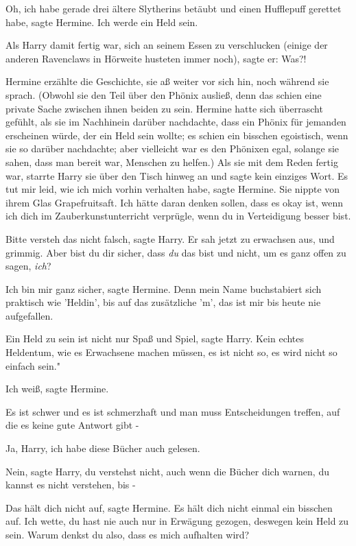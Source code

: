 \glqq{}Oh, ich habe gerade drei ältere Slytherins betäubt und einen Hufflepuff
gerettet habe\grqq{}, sagte Hermine. \glqq{}Ich werde ein Held sein.\grqq{}

Als Harry damit fertig war, sich an seinem Essen zu verschlucken (einige der
anderen Ravenclaws in Hörweite husteten immer noch), sagte er: \glqq
Was?!\grqq{}

Hermine erzählte die Geschichte, sie aß weiter vor sich hin, noch während sie
sprach. (Obwohl sie den Teil über den Phönix ausließ, denn das schien eine
private Sache zwischen ihnen beiden zu sein. Hermine hatte sich überrascht
gefühlt, als sie im Nachhinein darüber nachdachte, dass ein Phönix für jemanden
erscheinen würde, der ein Held sein wollte; es schien ein bisschen egoistisch,
wenn sie so darüber nachdachte; aber vielleicht war es den Phönixen egal,
solange sie sahen, dass man bereit war, Menschen zu helfen.) Als sie mit dem
Reden fertig war, starrte Harry sie über den Tisch hinweg an und sagte kein
einziges Wort. \glqq{}Es tut mir leid, wie ich mich vorhin verhalten habe\grqq{},
sagte Hermine. Sie nippte von ihrem Glas Grapefruitsaft. \glqq{}Ich hätte daran
denken sollen, dass es okay ist, wenn ich dich im Zauberkunstunterricht
verprügle, wenn du in Verteidigung besser bist.\grqq{}

\glqq{}Bitte versteh das nicht falsch\grqq{}, sagte Harry. Er sah jetzt zu
erwachsen aus, und grimmig. \glqq{}Aber bist du dir sicher, dass \emph{du} das
bist und nicht, um es ganz offen zu sagen, \emph{ich}?\grqq{}

\glqq{}Ich bin mir ganz sicher\grqq{}, sagte Hermine. \glqq{}Denn mein Name
buchstabiert sich praktisch wie 'Heldin', bis auf das zusätzliche 'm', das ist
mir bis heute nie aufgefallen.\grqq{}

\glqq{}Ein Held zu sein ist nicht nur Spaß und Spiel\grqq{}, sagte Harry. \glqq
Kein echtes Heldentum, wie es Erwachsene machen müssen, es ist nicht so, es wird
nicht so einfach sein."

\glqq{}Ich weiß\grqq{}, sagte Hermine.

\glqq{}Es ist schwer und es ist schmerzhaft und man muss Entscheidungen treffen,
auf die es keine gute Antwort gibt -\grqq{}

\glqq{}Ja, Harry, ich habe diese Bücher auch gelesen.\grqq{}

\glqq{}Nein\grqq{}, sagte Harry, \glqq{}du verstehst nicht, auch wenn die Bücher
dich warnen, du kannst es nicht verstehen, bis -\grqq{}

\glqq{}Das hält dich nicht auf\grqq{}, sagte Hermine. \glqq{}Es hält dich nicht
einmal ein bisschen auf. Ich wette, du hast nie auch nur in Erwägung gezogen,
deswegen kein Held zu sein. Warum denkst du also, dass es mich aufhalten
wird?\grqq{}

